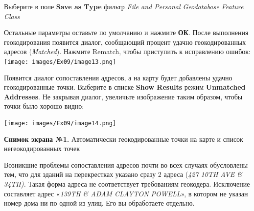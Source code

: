 \documentclass[12pt,]{book}
\begin{document}
\begin{enumerate}
  Выберите в поле \textbf{Save as Type} фильтр \emph{File and Personal Geodatabase Feature Class}

  Остальные параметры оставьте по умолчанию и нажмите \textbf{ОК}. После выполнения геокодирования появится диалог, сообщающий процент удачно геокодированных адресов (\emph{Matched}). Нажмите Rematch, чтобы приступить к исправлению ошибок: \texttt{[image: images/Ex09/image13.png]}

  Появится диалог сопоставления адресов, а на карту будет добавлены удачно геокодированные точки. Выберите в списке \textbf{Show Results} режим \textbf{Unmatched Addresses}. Не закрывая диалог, увеличьте изображение таким образом, чтобы точки было хорошо видно:

  \texttt{[image: images/Ex09/image14.png]}

  \textbf{Снимок экрана №1.} Автоматически геокодированные точки на карте и список негеокодированных точек
\end{enumerate}

Возникшие проблемы сопоставления адресов почти во всех случаях обусловлены тем, что для зданий на перекрестках указано сразу 2 адреса (\emph{427 10TH AVE \& 34TH).} Такая форма адреса не соответствует требованиям геокодера. Исключение составляет адрес «\emph{139TH \& ADAM CLAYTON POWELL}», в котором не указан номер дома ни по одной из улиц. Его вы обработаете отдельно.
\end{document}
